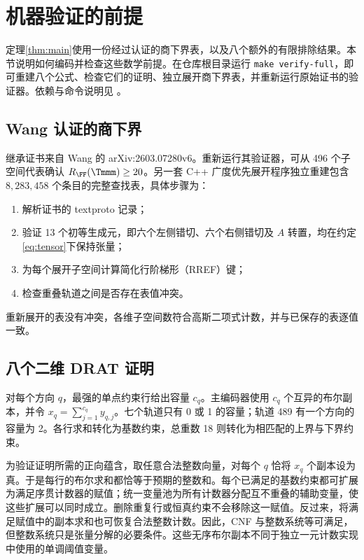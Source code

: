 \documentclass[11pt,a4paper]{article}
\begin{document}
\section{机器验证的前提}\label{sec:machine}

定理\ref{thm:main}使用一份经过认证的商下界表，以及八个额外的有限排除结果。本节说明如何编码并检查这些数学前提。在仓库根目录运行 \texttt{make verify-full}，即可重建八个公式、检查它们的证明、独立展开商下界表，并重新运行原始证书的验证器。依赖与命令说明见 。

\subsection{Wang 认证的商下界}

继承证书来自 Wang 的 arXiv:2603.07280v6\cite{wangautomated}。重新运行其验证器，可从 496 个子空间代表确认 $R_{\FF}(\Tmmm)\ge20$。另一套 C++ 广度优先展开程序独立重建包含 $8{,}283{,}458$ 个条目的完整查找表，具体步骤为：
\begin{enumerate}
  \item 解析证书的 textproto 记录；
  \item 验证 13 个初等生成元，即六个左侧错切、六个右侧错切及 $A$ 转置，均在约定\eqref{eq:tensor}下保持张量；
  \item 为每个展开子空间计算简化行阶梯形（RREF）键；
  \item 检查重叠轨道之间是否存在表值冲突。
\end{enumerate}
重新展开的表没有冲突，各维子空间数符合高斯二项式计数，并与已保存的表逐值一致。

\subsection{八个二维 DRAT 证明}

对每个方向 $q$，最强的单点约束行给出容量 $c_q$。主编码器使用 $c_q$ 个互异的布尔副本，并令 $x_q=\sum_{j=1}^{c_q}y_{q,j}$。七个轨道只有 0 或 1 的容量；轨道 489 有一个方向的容量为 2。各行求和转化为基数约束，总重数 18 则转化为相匹配的上界与下界约束。

为验证证明所需的正向蕴含，取任意合法整数向量，对每个 $q$ 恰将 $x_q$ 个副本设为真。于是每行的布尔求和都恰等于预期的整数和。每个已满足的基数约束都可扩展为满足序贯计数器的赋值；统一变量池为所有计数器分配互不重叠的辅助变量，使这些扩展可以同时成立。删除重复行或恒真约束不会移除这一赋值。反过来，将满足赋值中的副本求和也可恢复合法整数计数。因此，CNF 与整数系统等可满足，但整数系统只是张量分解的必要条件。这些无序布尔副本不同于独立一元计数实现中使用的单调阈值变量。
\end{document}

